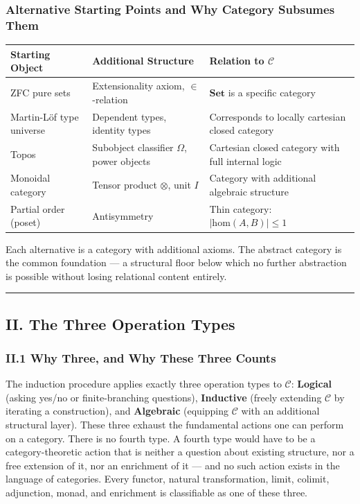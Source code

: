 \documentclass[12pt,a4paper]{article}
\begin{document}
\subsubsection{Alternative Starting Points and Why Category Subsumes Them}

\begin{table}[htbp]
\centering
\small
{}
\begin{tabularx}{\textwidth}{>{\centering\arraybackslash}X >{\centering\arraybackslash}X >{\centering\arraybackslash}X}
\toprule
\rowcolor{gray!25}\textbf{Starting Object} & \textbf{Additional Structure} & \textbf{Relation to $\mathcal{C}$} \\
\midrule
\rowcolors{1}{white}{gray!10}
ZFC pure sets & Extensionality axiom, $\in$-relation & $\mathbf{Set}$ is a specific category \\
Martin-L\"of type universe & Dependent types, identity types & Corresponds to locally cartesian closed category \\
Topos & Subobject classifier $\Omega$, power objects & Cartesian closed category with full internal logic \\
Monoidal category & Tensor product $\otimes$, unit $I$ & Category with additional algebraic structure \\
Partial order (poset) & Antisymmetry & Thin category: $|\text{hom}(A,B)| \leq 1$ \\
\bottomrule
\end{tabularx}
\end{table}

Each alternative is a category with additional axioms. The abstract category is the common foundation --- a structural floor below which no further abstraction is possible without losing relational content entirely.

\begin{center}
\rule{0.5\textwidth}{0.4pt}
\end{center}

\subsection{II. The Three Operation Types}

\subsubsection{II.1 Why Three, and Why These Three Counts}

The induction procedure applies exactly three operation types to $\mathcal{C}$: \textbf{Logical} (asking yes/no or finite-branching questions), \textbf{Inductive} (freely extending $\mathcal{C}$ by iterating a construction), and \textbf{Algebraic} (equipping $\mathcal{C}$ with an additional structural layer). These three exhaust the fundamental actions one can perform on a category. There is no fourth type. A fourth type would have to be a category-theoretic action that is neither a question about existing structure, nor a free extension of it, nor an enrichment of it --- and no such action exists in the language of categories. Every functor, natural transformation, limit, colimit, adjunction, monad, and enrichment is classifiable as one of these three.
\end{document}
